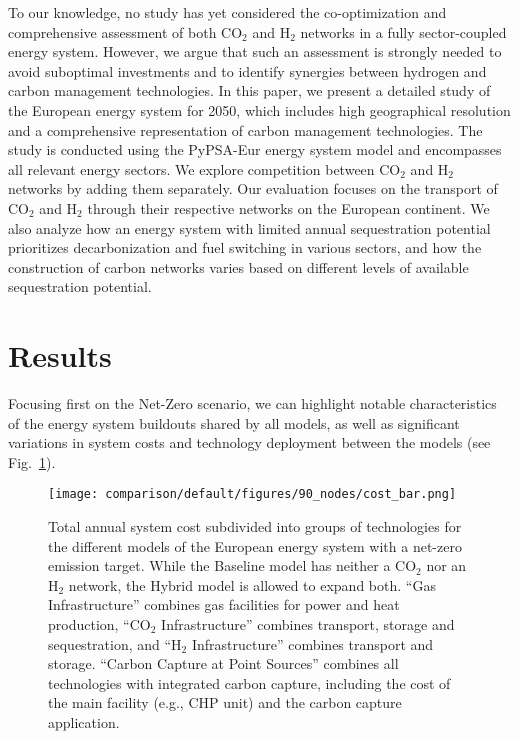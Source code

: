 \documentclass[twocolumn]{article}
\newcommand{\COtwo}{CO$_2$}
\newcommand{\Htwo}{H$_2$}
\newcommand{\modBase}{Baseline model}
\newcommand{\modHybrid}{Hybrid model}
\begin{document}
To our knowledge, no study has yet considered the co-optimization and comprehensive assessment of both \COtwo{} and \Htwo{} networks in a fully sector-coupled energy system. However, we argue that such an assessment is strongly needed to avoid suboptimal investments and to identify synergies between hydrogen and carbon management technologies. In this paper, we present a detailed study of the European energy system for 2050, which includes high geographical resolution and a comprehensive representation of carbon management technologies. The study is conducted using the PyPSA-Eur energy system model and encompasses all relevant energy sectors. We explore competition between \COtwo{} and \Htwo{} networks by adding them separately. Our evaluation focuses on the transport of \COtwo{} and \Htwo{} through their respective networks on the European continent. We also analyze how an energy system with limited annual sequestration potential prioritizes decarbonization and fuel switching in various sectors, and how the construction of carbon networks varies based on different levels of available sequestration potential.





\section{Results}
\label{sec:results}


Focusing first on the Net-Zero scenario, we can highlight notable characteristics of the energy system buildouts shared by all models, as well as significant variations in system costs and technology deployment between the models (see Fig.~\ref{fig:cost_bar}).

\begin{figure}[ht!]
    \centering
    \texttt{[image: comparison/default/figures/90\_nodes/cost\_bar.png]}
    \caption[short]{Total annual system cost subdivided into groups of technologies for the different models of the European energy system with a net-zero emission target. While the \modBase{} has neither a \COtwo{} nor an \Htwo{} network, the \modHybrid{} is allowed to expand both. ``Gas Infrastructure'' combines gas facilities for power and heat production, ``\COtwo{} Infrastructure'' combines transport, storage and sequestration, and ``\Htwo{} Infrastructure'' combines transport and storage. ``Carbon Capture at Point Sources'' combines all technologies with integrated carbon capture, including the cost of the main facility (e.g., CHP unit) and the carbon capture application.}
    \label{fig:cost_bar}
\end{figure}
\end{document}
